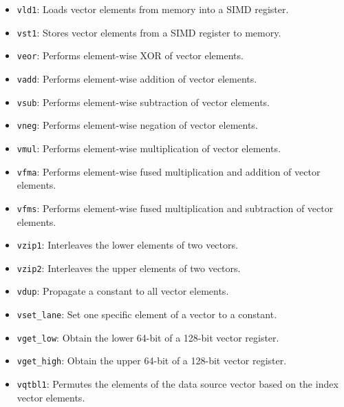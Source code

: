 \begin{itemize}
    \item \texttt{vld1}: Loads vector elements from memory into a SIMD register.

    \item \texttt{vst1}: Stores vector elements from a SIMD register to memory.

    \item \texttt{veor}: Performs element-wise XOR of vector elements.
    
    \item \texttt{vadd}: Performs element-wise addition of vector elements.
    
    \item \texttt{vsub}: Performs element-wise subtraction of vector elements.

    \item \texttt{vneg}: Performs element-wise negation of vector elements.
    
    \item \texttt{vmul}: Performs element-wise multiplication of vector elements.

    \item \texttt{vfma}: Performs element-wise fused multiplication and addition of vector elements.

    \item \texttt{vfms}: Performs element-wise fused multiplication and subtraction of vector elements.
    
    \item \texttt{vzip1}: Interleaves the lower elements of two vectors.
    
    \item \texttt{vzip2}: Interleaves the upper elements of two vectors.

    \item \texttt{vdup}: Propagate a constant to all vector elements.

    \item \texttt{vset\_lane}: Set one specific element of a vector to a constant.

    \item \texttt{vget\_low}: Obtain the lower 64-bit of a 128-bit vector register.

    \item \texttt{vget\_high}: Obtain the upper 64-bit of a 128-bit vector register.

    \item \texttt{vqtbl1}: Permutes the elements of the data source vector based on the index vector elements.


\end{itemize}
